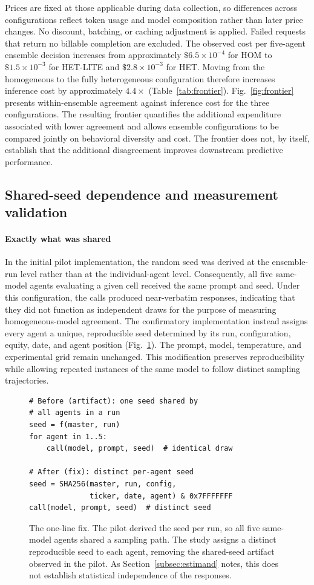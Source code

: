 \documentclass{ieeeaccess}
\begin{document}
Prices are fixed at those applicable during data collection, so differences across
configurations reflect token usage and model composition rather than later price
changes. No discount, batching, or caching adjustment is applied. Failed requests
that return no billable completion are excluded. The observed
cost per five-agent ensemble decision increases from approximately
$\$6.5\times 10^{-4}$ for HOM to $\$1.5\times 10^{-3}$ for HET-LITE and
$\$2.8\times 10^{-3}$ for HET. Moving from the homogeneous to the fully
heterogeneous configuration therefore increases inference cost by approximately
$4.4\times$ (Table~\ref{tab:frontier}). Fig.~\ref{fig:frontier} presents
within-ensemble agreement against inference cost for the three configurations.
The resulting frontier quantifies the additional expenditure associated with
lower agreement and allows ensemble configurations to be compared jointly on
behavioral diversity and cost. The frontier does not, by itself, establish that
the additional disagreement improves downstream predictive performance.

\subsection{Shared-seed dependence and measurement validation}
\label{sec:protocol}
\paragraph{Exactly what was shared}
In the initial pilot implementation, the random seed was derived at the
ensemble-run level rather than at the individual-agent level. Consequently, all
five same-model agents evaluating a given cell received the same prompt and
seed. Under this configuration, the calls produced near-verbatim responses,
indicating that they did not function as independent draws for the purpose of
measuring homogeneous-model agreement. The confirmatory implementation instead
assigns every agent a unique, reproducible seed determined by its run,
configuration, equity, date, and agent position (Fig.~\ref{fig:seed}). The
prompt, model, temperature, and experimental grid remain unchanged. This
modification preserves reproducibility while allowing repeated instances of the
same model to follow distinct sampling trajectories.

\begin{figure}[!t]
\centering
\begin{lstlisting}
# Before (artifact): one seed shared by
# all agents in a run
seed = f(master, run)
for agent in 1..5:
    call(model, prompt, seed)  # identical draw

# After (fix): distinct per-agent seed
seed = SHA256(master, run, config,
              ticker, date, agent) & 0x7FFFFFFF
call(model, prompt, seed)  # distinct seed
\end{lstlisting}
\caption{The one-line fix. The pilot derived the seed per run, so all five
same-model agents shared a sampling path. The study assigns a distinct
reproducible seed to each agent, removing the shared-seed artifact observed in
the pilot. As Section~\ref{subsec:estimand} notes, this does not establish
statistical independence of the responses.}
\label{fig:seed}
\end{figure}
\end{document}

